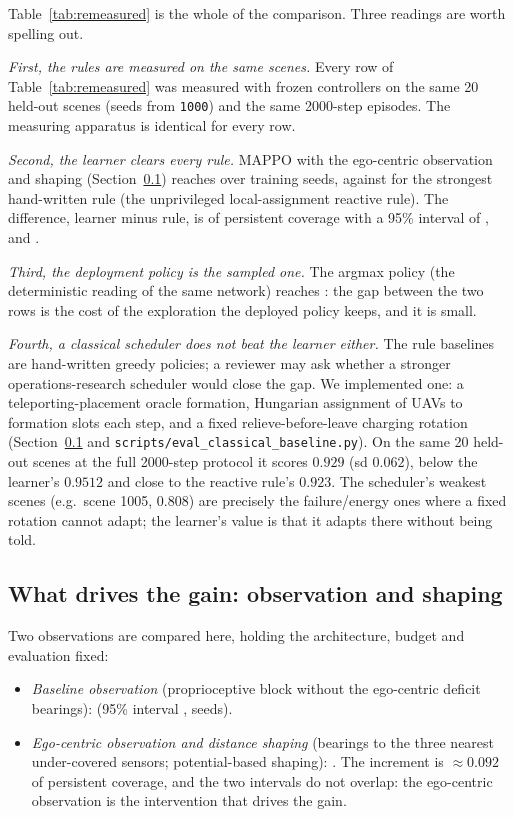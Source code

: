 \documentclass[conference]{IEEEtran}
\begin{document}
Table~\ref{tab:remeasured} is the whole of the comparison.  Three readings are
worth spelling out.

\emph{First, the rules are measured on the same scenes.}  Every row of
Table~\ref{tab:remeasured} was measured with frozen controllers on the same
20 held-out scenes (seeds from \texttt{1000}) and the same 2000-step
episodes.  The measuring apparatus is identical for every row.

\emph{Second, the learner clears every rule.}  MAPPO with the ego-centric
observation and shaping (Section~\ref{sec:results_abl}) reaches
\tokEgoShapeCK{} over \tokEgoShapeN{} training seeds, against
\tokRuleReactiveLocalCK{} for the strongest hand-written rule (the
unprivileged local-assignment reactive rule).  The difference, learner minus
rule, is \tokLearnerMinusRule{} of persistent coverage with a 95\% interval
of \tokLearnerMinusRuleCi, and \tokGapVerdict.

\emph{Third, the deployment policy is the sampled one.}  The argmax policy
(the deterministic reading of the same network) reaches \tokEgoShapeDetCK{}:
the gap between the two rows is the cost of the exploration the deployed
policy keeps, and it is small.

\emph{Fourth, a classical scheduler does not beat the learner either.}  The
rule baselines are hand-written greedy policies; a reviewer may ask whether a
stronger operations-research scheduler would close the gap.  We implemented
one: a teleporting-placement oracle formation, Hungarian assignment of UAVs
to formation slots each step, and a fixed relieve-before-leave charging
rotation (Section~\ref{sec:results_abl} and
\texttt{scripts/eval\_classical\_baseline.py}).  On the same 20 held-out
scenes at the full 2000-step protocol it scores $0.929$ (sd $0.062$),
below the learner's $0.9512$ and close to the reactive rule's $0.923$.  The
scheduler's weakest scenes (e.g.\ scene 1005, $0.808$) are precisely the
failure/energy ones where a fixed rotation cannot adapt; the learner's value
is that it adapts there without being told.

\subsection{What drives the gain: observation and shaping}
\label{sec:results_abl}

Two observations are compared here, holding the architecture, budget and evaluation fixed:

\begin{itemize}
  \item \emph{Baseline observation} (proprioceptive block without the
        ego-centric deficit bearings): \tokBugFixCK{} (95\% interval \tokBugFixCi,
        \tokBugFixN{} seeds).
  \item \emph{Ego-centric observation and distance shaping} (bearings to
        the three nearest under-covered sensors; potential-based shaping):
        \tokEgoShapeCK.  The increment is $\approx 0.092$ of persistent
        coverage, and the two intervals do not overlap: the ego-centric
        observation is the intervention that drives the gain.
\end{itemize}
\end{document}

